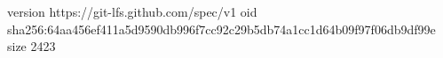 version https://git-lfs.github.com/spec/v1
oid sha256:64aa456ef411a5d9590db996f7cc92c29b5db74a1cc1d64b09f97f06db9df99e
size 2423
